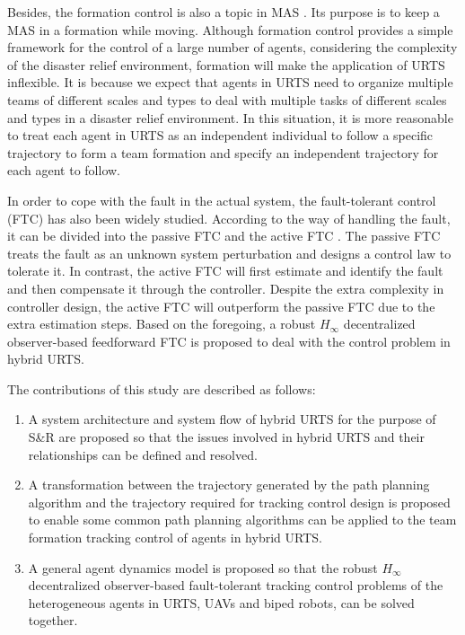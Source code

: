 \documentclass{ieeeaccess}
\begin{document}
Besides, the formation control is also a topic in MAS \cite{wang2022consensus}. Its purpose is to keep a MAS in a formation while moving. Although formation control provides a simple framework for the control of a large number of agents, considering the complexity of the disaster relief environment, formation will make the application of URTS inflexible. It is because we expect that agents in URTS need to organize multiple teams of different scales and types to deal with multiple tasks of different scales and types in a disaster relief environment. In this situation, it is more reasonable to treat each agent in URTS as an independent individual to follow a specific trajectory to form a team formation
and specify an independent trajectory for each agent to follow.

In order to cope with the fault in the actual system, the fault-tolerant control (FTC) has also been widely studied. According to the way of handling the fault, it can be divided into the passive FTC and the active FTC \cite{6669235}. The passive FTC treats the fault as an unknown system perturbation and designs a control law to tolerate it. In contrast, the active FTC will first estimate and identify the fault and then compensate it through the controller. Despite the extra complexity in controller design, the active FTC will outperform the passive FTC due to the extra estimation steps. Based on the foregoing, a robust $H_\infty$ decentralized observer-based feedforward FTC is proposed to deal with the control problem in hybrid URTS.

The contributions of this study are described as follows:
\begin{enumerate}
    \item A system architecture and system flow of hybrid URTS for the purpose of S\&R are proposed so that the issues involved in hybrid URTS and their relationships can be defined and resolved.
    \item A transformation between the trajectory generated by the path planning algorithm and the trajectory required for tracking control design is proposed to enable some common path planning algorithms can be applied to the team formation tracking control of agents in hybrid URTS.
    \item A general agent dynamics model is proposed so that the robust $H_\infty$ decentralized observer-based fault-tolerant tracking control problems of the heterogeneous agents in URTS, UAVs and biped robots, can be solved together.
\end{enumerate}
\end{document}
